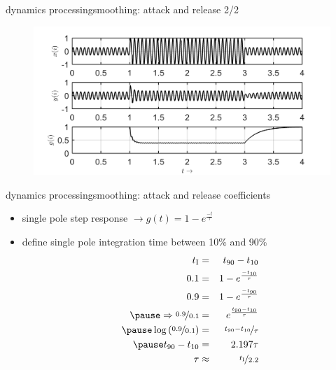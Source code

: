 \begin{frame}{dynamics processing}{smoothing: attack and release 2/2}
	\vspace{-5mm}
    \begin{figure}
		\centering
			\includegraphics[scale=1]{graph/comp_sine}
	\end{figure}
\end{frame}

\begin{frame}{dynamics processing}{smoothing: attack and release coefficients}
    \begin{itemize}
        \item   single pole step response $\rightarrow g(t) = 1-e^{\frac{-t}{\tau}}$ 
        \pause
        \item   define single pole integration time between 10\% and 90\%
            \begin{eqnarray*}
                t_\mathrm{I} &=& t_{90} - t_{10}\\
                0.1 &=& 1 - e^{\frac{-t_{10}}{\tau}}\\
                0.9 &=& 1 - e^{\frac{-t_{90}}{\tau}}\\
        \pause
            \Rightarrow \nicefrac{0.9}{0.1} &=& e^{\frac{t_{90}-t_{10}}{\tau}}\\
        \pause
            \log\left(\nicefrac{0.9}{0.1}\right) &=& \nicefrac{t_{90}-t_{10}}{\tau}\\
        \pause
            t_{90}-t_{10} &=& 2.197\tau\\
            \tau &\approx& \nicefrac{t_\mathrm{I}}{2.2}
        \end{eqnarray*}

    \end{itemize}
\end{frame}

